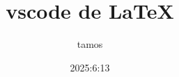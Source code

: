 \documentclass[a4paper,11pt]{jsarticle}
\begin{document}
\title{vscode de \LaTeX}
\author{tamos}
\date{2025:6:13}
\maketitle
\end{document}
